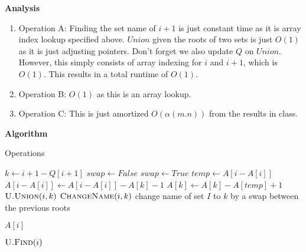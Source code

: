 \documentclass{article}
\begin{document}
\textbf{Analysis}

\begin{enumerate}
    \item Operation A: Finding the set name of $i + 1$ is just constant time as it is array index lookup specified
        above. $Union$ given the roots of two sets is just $O(1)$ as it is just adjusting pointers. Don't forget we also
        update $Q$ on $Union$. However, this simply consists of array indexing for $i$ and $i + 1$, which is $O(1)$.
        This results in a total runtime of $O(1)$.
    \item Operation B: $O(1)$ as this is an array lookup.
    \item Operation C: This is just amortized $O(\alpha (m. n))$ from the results in class.
\end{enumerate}


\textbf{Algorithm}


\begin{algorithm}
    \caption{Operations}\label{euclid}
    \begin{algorithmic}[1]
        \State $k \gets i + 1 - Q[i + 1]$  
        \State $swap \gets False$
            \State $swap \gets True$
        \EndIf
        \State $temp \gets A[i - A[i]]$
        \State $A[i - A[i]] \gets A[i - A[i]] - A[k] - 1$
        \State $A[k] \gets A[k] - A[temp] + 1$
        \State $\Call{U.Union}{i, k}$
            \State $\Call{ChangeName}{i, k}$ \Comment change name of set $I$ to $k$ by a swap between the previous roots
        \EndIf
        \EndProcedure
    \end{algorithmic}


    \begin{algorithmic}[1]
        \State \Return $A[i]$
        \EndProcedure
    \end{algorithmic}

    \begin{algorithmic}[1]
        \State \Return $ \Call{U.Find}{i}$
        \EndProcedure
    \end{algorithmic}
\end{algorithm}
\end{document}
